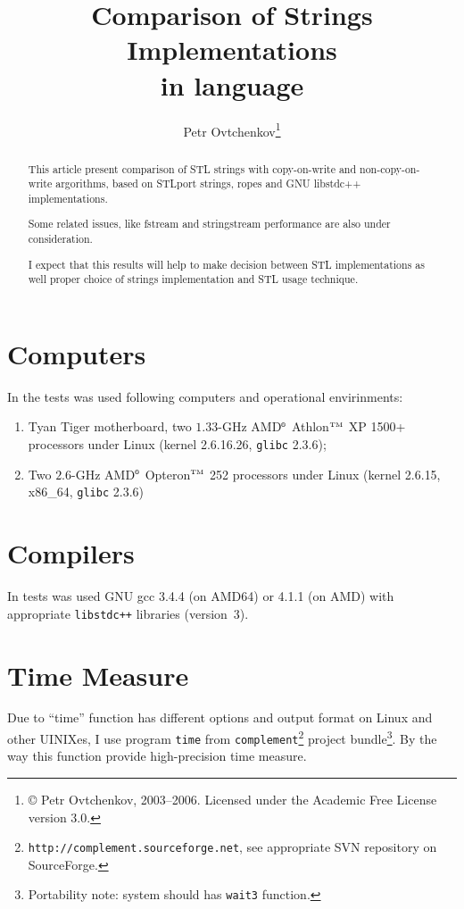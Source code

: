 \documentclass[a4paper]{article}
\title{Comparison of Strings Implementations \\ in \CPP{} language}
\author{Petr Ovtchenkov\footnote{\copyright{} Petr Ovtchenkov, 2003--2006. Licensed under the Academic Free License version 3{.}0.}}
\providecommand{\STLport}{{\fontfamily{cmss}\selectfont STLport}}
\providecommand{\libstd}{{\fontfamily{cmtt}\selectfont GNU \mbox{libstdc++}}}
\begin{document}
\maketitle

\begin{abstract}
This article present comparison of STL strings with copy-on-write and
non-copy-on-write argorithms, based on \STLport{} strings, ropes
and \libstd{} implementations.

Some related issues, like fstream and stringstream performance
are also under consideration.

I expect that this results will help to make decision between
STL implementations as well proper choice of strings implementation
and STL usage technique.
\end{abstract}

\tableofcontents

\section{Computers}

In the tests was used following computers and operational envirinments:
\begin{enumerate}
  \item Tyan Tiger motherboard, two $1.33$-GHz
        AMD$^{\mbox{\tiny\textregistered}}$ Athlon$^{\mbox{\tiny TM}}$ XP 1500+ processors under Linux (kernel 2{.}6{.}16{.}26, \verb|glibc| 2{.}3{.}6);\label{AMD}
  \item Two $2.6$-GHz AMD$^{\mbox{\tiny\textregistered}}$ Opteron$^{\mbox{\tiny TM}}$ 252 processors under Linux (kernel 2{.}6{.}15, x86\_64, \verb|glibc| 2{.}3{.}6)\label{AMD64}
\end{enumerate}

\section{Compilers}

In tests was used GNU gcc 3{.}4{.}4 (on AMD64) or 4{.}1{.}1 (on AMD)
with appropriate
\verb|libstdc++| libraries (version~3).

\section{Time Measure\label{timemeasure}}

Due to ``time'' function has different options and output format on Linux
and other UINIXes, I use program \texttt{time} from
\texttt{complement}\footnote{\texttt{http://complement.sourceforge.net}, see appropriate SVN repository on SourceForge.}
project bundle\footnote{Portability note: system should has \texttt{wait3} function.}.
By the way this function provide high-precision time measure.
\end{document}
